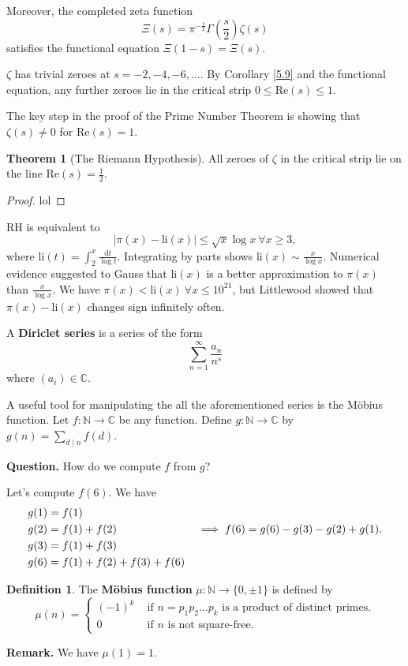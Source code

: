 \documentclass{article}
\theoremstyle{definition}
\newtheorem{theorem}{Theorem}[section]
\newtheorem{defn}{Definition}[section]
\begin{document}
Moreover, the completed zeta function \[
\Xi(s)=\pi^{-\frac{s}{2}} \Gamma \left(\frac{s}{2}\right)\zeta(s)
\] satisfies the functional equation $\Xi(1-s)=\Xi(s)$.
\vspace{1mm}

$\zeta$ has trivial zeroes at $s=-2,-4,-6,\ldots$. By Corollary \ref{5.9} and the functional equation, any further zeroes lie in the critical strip $0\le \text{Re}(s)\le 1$.

The key step in the proof of the Prime Number Theorem is showing that $\zeta(s) \neq 0$ for $\text{Re}(s)=1$.

\begin{theorem}[The Riemann Hypothesis]
    All zeroes of $\zeta$ in the critical strip lie on the line $\text{Re}(s)=\frac{1}{2}$.
\end{theorem}
\begin{proof}
    lol
\end{proof}
RH is equivalent to $$|\pi(x)-\text{li}(x)|\le \sqrt{x}\log x ~\forall x\ge 3,$$ where $\text{li}(t)=\int_{2}^{x} \frac{\mathrm{d}t}{\log t}$. Integrating by parts shows $\text{li}(x) \sim\frac{x}{\log x}$. Numerical evidence suggested to Gauss that $\text{li}(x)$ is a better approximation to $\pi(x)$ than $\frac{x}{\log x}$. We have $\pi(x)<\text{li}(x) ~\forall x \le 10^{21}$, but Littlewood showed that $\pi(x)-\text{li}(x)$ changes sign infinitely often.
\vspace{1mm}

A \textbf{Diriclet series} is a series of the form $$\sum_{n=1}^{\infty} \frac{a_n}{n^s}$$ where $(a_i) \in \mathbb{C}$. 

A useful tool for manipulating the all the aforementioned series is the Möbius function. Let $f: \mathbb{N} \to \mathbb{C}$ be any function. Define $g : \mathbb{N} \to \mathbb{C}$ by $g(n)=\sum_{d \mid n}^{} f(d)$.

\textbf{Question.} How do we compute $f$ from $g$?

Let's compute $f(6)$. We have 
\begin{align*}
    &g(1)=f(1)\\
    &g(2)=f(1)+f(2) \hspace{25mm} \implies f(6)=g(6)-g(3)-g(2)+g(1).\\
    &g(3)=f(1)+f(3)\\
    &g(6)=f(1)+f(2)+f(3)+f(6)
\end{align*}
\begin{defn}
    The \textbf{Möbius function} $\mu : \mathbb{N} \to \{0,\pm 1\}$ is defined by 
    \[
    \mu(n) = \begin{cases}
        (-1)^k &\text{ if } n=p_1p_2\ldots p_k \text{ is a product of distinct primes.}\\
        0 &\text{ if }n \text{ is not square-free.}
    \end{cases}
    \]
\end{defn}
\textbf{Remark.} We have $\mu(1)=1$.
\vspace{1mm}
\end{document}
